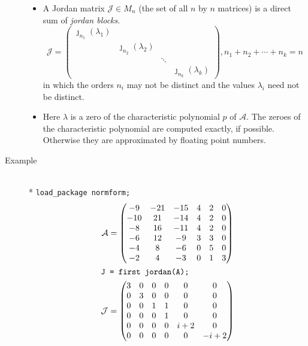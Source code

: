 \begin{description}
\begin{itemize}
\item A Jordan matrix $\mathcal{J} \in M_{n}$ (the set of all $n$ by $n$ 
      matrices) is a direct sum of {\it jordan blocks}.
%
      \begin{displaymath}
      \mathcal{J} = \begin{pmatrix} \jmath_{n_1}(\lambda_{1}) 
      \\  & \jmath_{n_2}(\lambda_{2}) \\ & & \ddots \\ & & & 
      \jmath_{n_k}(\lambda_{k}) \end{pmatrix},
       n_{1}+ n_{2}+\cdots +n_{k} = n
      \end{displaymath}
%
      in which the orders $n_{i}$ may not be distinct and the 
      values ${\lambda_{i}}$ need not be distinct.

\item Here ${\lambda}$ is a zero of the characteristic polynomial 
      $p$ of $\mathcal{A}$. The zeroes of the characteristic 
      polynomial are computed exactly, if possible. Otherwise they are 
      approximated by floating point numbers.
\end{itemize}      

\item[Example]\mbox{}\\*
%
\texttt{load\_package normform;}
\begin{gather*}
\mathcal{A} = \begin{pmatrix} -9 & -21 & -15 & 4 & 2 & 0 \\
-10 & 21 & -14 & 4 & 2 & 0 \\ -8 & 16 & -11 & 4 & 2 & 0 \\ -6 & 12 & -9 
& 3 & 3 & 0 \\ -4 & 8 & -6 & 0 & 5 & 0 \\ -2 & 4 & -3 & 0 & 1 & 3 
\end{pmatrix} \\ 
\intertext{\texttt{J = first jordan(A);}}
%
\mathcal{J} = \begin{pmatrix} 3 & 0 & 0 & 0 & 0 & 0 \\ 0 & 3 
& 0 & 0 & 0 & 0 \\ 0 & 0 & 1 & 1 & 0 & 0 \\ 0 & 0 & 0 & 1 & 0 & 0 \\
 0 & 0 & 0 & 0 & i+2 & 0 \\ 0 & 0 & 0 & 0 & 0 & -i+2 
\end{pmatrix}
\end{gather*}
\end{description}



